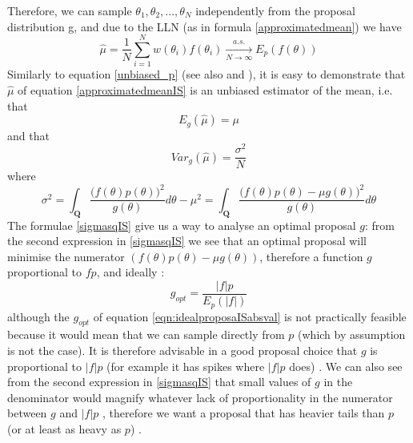 \documentclass[12pt,mythesisstyle]{report}
\begin{document}
Therefore, we can sample $\theta_1,\theta_2,...,\theta_N$ independently from the proposal distribution g, and due to the LLN (as in formula \eqref{approximatedmean}) we have
\begin{equation}\label{approximatedmeanIS2}
\hat{\mu}=\frac{1}{N}\sum_{i=1}^{N}w(\theta_{i})f(\theta_{i}) \xrightarrow[N \to \infty]{a.s.} E_{p}(f(\theta))
\end{equation}
Similarly to equation \eqref{unbiased_p} (see also \cite{mcmcnotes} and \cite{OwenIS}), it is easy to demonstrate that $\hat{\mu}$ of equation \eqref{approximatedmeanIS} is an unbiased estimator of the mean, i.e. that
\begin{equation}
E_g(\hat{\mu})=\mu
\end{equation}
and that \cite{OwenIS}
\begin{equation}\label{varianceIS}
Var_g(\hat{\mu})=\frac{\sigma^2}{N}
\end{equation}
where
\begin{equation}\label{sigmasqIS}
\sigma^2=\int_{\mathbf{Q}}\frac{\big(f(\theta)p(\theta)\big)^2}{g(\theta)}d\theta-\mu^2=\int_{\mathbf{Q}}\frac{\big(f(\theta)p(\theta)-\mu g(\theta)\big)^2}{g(\theta)}d\theta
\end{equation}
The formulae \eqref{sigmasqIS} give us a way to analyse an optimal proposal $g$: from the second expression in  \eqref{sigmasqIS} we see that an optimal proposal will minimise the numerator $(f(\theta)p(\theta)-\mu g(\theta))$, therefore a function $g$ proportional to $fp$, and ideally \cite{OwenIS}:
\begin{equation}\label{eqn:idealproposaISabsval}
g_{opt}=\frac{|f|p}{E_p(|f|)}
\end{equation}
although the $g_{opt}$ of equation \eqref{eqn:idealproposaISabsval} is not practically feasible because it would mean that we can sample directly from $p$ (which by assumption is not the case). It is therefore advisable in a good proposal choice that $g$ is proportional to $|f|p$ (for example it has spikes where $|f|p$ does) \cite{OwenIS}. We can also see from the second expression in \eqref{sigmasqIS} that small values of $g$ in the denominator would magnify whatever lack of proportionality in the numerator between $g$ and $|f|p$ \cite{OwenIS}, therefore we want a proposal that has heavier tails than $p$ (or at least as heavy as $p$) \cite{mcmcnotes}. 
\end{document}
